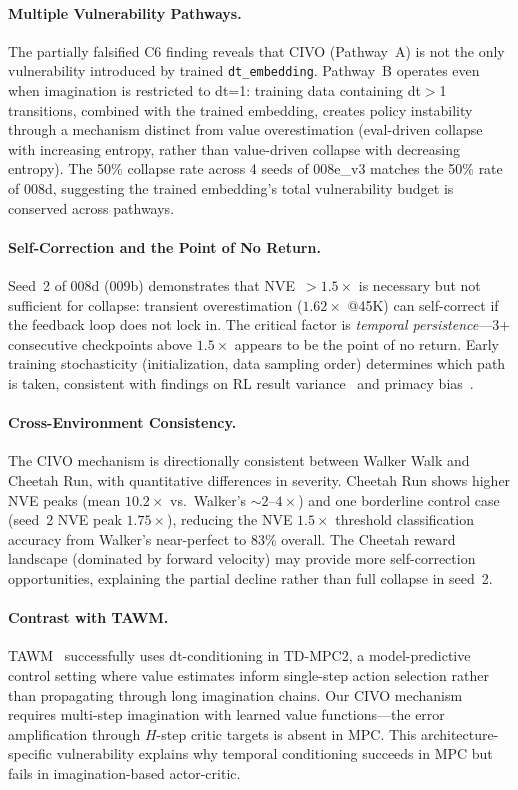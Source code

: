 \documentclass[10pt,letterpaper]{article}
\begin{document}
\paragraph{Multiple Vulnerability Pathways.}
The partially falsified C6 finding reveals that CIVO (Pathway~A) is not the only vulnerability introduced by trained \texttt{dt\_embedding}.
Pathway~B operates even when imagination is restricted to dt=1: training data containing dt$>$1 transitions, combined with the trained embedding, creates policy instability through a mechanism distinct from value overestimation (eval-driven collapse with increasing entropy, rather than value-driven collapse with decreasing entropy).
The 50\% collapse rate across 4 seeds of 008e\_v3 matches the 50\% rate of 008d, suggesting the trained embedding's total vulnerability budget is conserved across pathways.

\paragraph{Self-Correction and the Point of No Return.}
Seed~2 of 008d (009b) demonstrates that NVE~$>1.5\times$ is necessary but not sufficient for collapse: transient overestimation ($1.62\times$ @45K) can self-correct if the feedback loop does not lock in.
The critical factor is \emph{temporal persistence}---3+ consecutive checkpoints above $1.5\times$ appears to be the point of no return.
Early training stochasticity (initialization, data sampling order) determines which path is taken, consistent with findings on RL result variance~\citep{henderson2018matters} and primacy bias~\citep{nikishin2022primacy}.

\paragraph{Cross-Environment Consistency.}
The CIVO mechanism is directionally consistent between Walker Walk and Cheetah Run, with quantitative differences in severity.
Cheetah Run shows higher NVE peaks (mean $10.2\times$ vs.\ Walker's $\sim 2$--$4\times$) and one borderline control case (seed~2 NVE peak $1.75\times$), reducing the NVE $1.5\times$ threshold classification accuracy from Walker's near-perfect to 83\% overall.
The Cheetah reward landscape (dominated by forward velocity) may provide more self-correction opportunities, explaining the partial decline rather than full collapse in seed~2.

\paragraph{Contrast with TAWM.}
TAWM~\citep{nhu2025tawm} successfully uses dt-conditioning in TD-MPC2, a model-predictive control setting where value estimates inform single-step action selection rather than propagating through long imagination chains.
Our CIVO mechanism requires multi-step imagination with learned value functions---the error amplification through $H$-step critic targets is absent in MPC.
This architecture-specific vulnerability explains why temporal conditioning succeeds in MPC but fails in imagination-based actor-critic.
\end{document}
